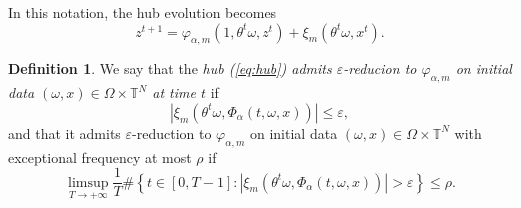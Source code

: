 \documentclass[a4paper]{article}
\theoremstyle{plain}
\theoremstyle{definition}
\newtheorem{defn}[theorem]{Definition}%
\newcommand{\T}{\mathbb{T}}
\begin{document}
In this notation, the hub evolution becomes
$$z^{t+1}= \varphi_{\alpha,m}(1,\theta^t\omega,z^t) + \xi_m(\theta^t\omega,x^t).$$

\begin{defn}\label{def:reduction}
	We say that the \textit{hub (\ref{eq:hub}) admits $\varepsilon$-reducion to $\varphi_{\alpha,m}$ on initial data $(\omega,x)\in\Omega\times \T^N$ at time $t$} if 
	$$| \xi_m(\theta^t\omega,\Phi_{\alpha}(t,\omega,x))|\leq \varepsilon,$$
and that it admits $\varepsilon$-reduction to $\varphi_{\alpha,m}$ on initial data $(\omega,x)\in\Omega\times \T^N$ with exceptional frequency at most $\rho$ if 
	\[
	\limsup_{T\to+\infty} \frac{1}{T} \# \left\{t\in[0,T-1]: | \xi_m(\theta^t\omega,\Phi_{\alpha}(t,\omega,x))|>\varepsilon\right\} \leq  \rho.
	\]
\end{defn}
\end{document}
